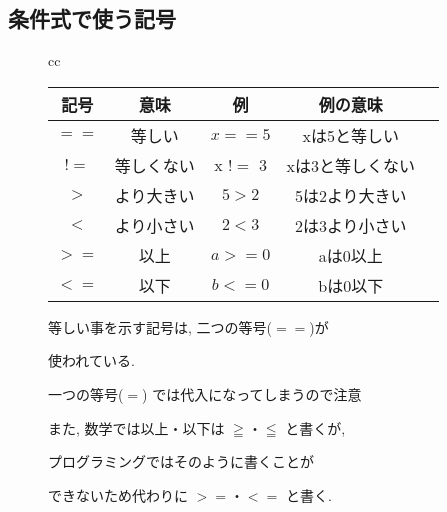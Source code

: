 \documentclass{jsarticle}
\begin{document}
\subsection{条件式で使う記号}
\begin{figure}[h]
	\begin{tabular}{cc}
		\begin{minipage}[c]{.5\textwidth}
			\begin{tabular}[t]{|c|c|c|c|c|}
				\hline
				記号 & 意味       & 例       & 例の意味         \\
				\hline \hline
				$==$ & 等しい     & $x == 5$ & xは5と等しい     \\ \hline
				$!=$ & 等しくない & x $!=$ 3 & xは3と等しくない \\ \hline
				$>$  & より大きい & $5 > 2$  & 5は2より大きい   \\ \hline
				$<$  & より小さい & $2 < 3$  & 2は3より小さい   \\ \hline
				$>=$ & 以上       & $a >= 0$ & aは0以上         \\ \hline
				$<=$ & 以下       & $b <= 0$ & bは0以下         \\ \hline
			\end{tabular}
		\end{minipage}
		\begin{minipage}[c]{.465\textwidth}
			\begin{screen}
				等しい事を示す記号は, 二つの等号($==$)が \par 使われている.  \par
				一つの等号($=$) では代入になってしまうので注意 \par
				また, 数学では以上・以下は $\geqq$・$\leqq$ と書くが, \par プログラミングではそのように書くことが \par できないため代わりに $>=$・$<=$ と書く.
			\end{screen}
		\end{minipage}
	\end{tabular}
\end{figure}
\newpage
\end{document}
